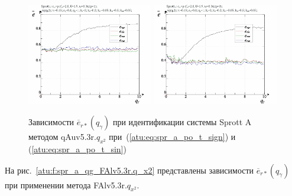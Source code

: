 \begin{figure}[h!]
  \centerline{
    \includegraphics[width=0.49\textwidth]{p/cha/spr_a/qAuv5.3r/sprott_a_qAuv5_3r_qx2-p_qgamma_e_sign.png}
    \hfill
    \includegraphics[width=0.49\textwidth]{p/cha/spr_a/qAuv5.3r/sprott_a_qAuv5_3r_qx2-p_qgamma_e_sin.png}
  }
  \caption{Зависимости $\overline{e}_{r*}(q_\gamma)$ при идентификации системы Sprott A методом qAuv5.3r.$q_{x^2}$
   при~(\ref{atu:eq:spr_a_po_t_sign}) и (\ref{atu:eq:spr_a_po_t_sin})}
  \label{atu:f:spr_a_qg_qAuv5.3r.q_x2}
\end{figure}

На рис.~\ref{atu:f:spr_a_qg_FAlv5.3r.q_x2} представлены зависимости
$\overline{e}_{r*}(q_\gamma)$ при применении метода FAlv5.3r.$q_{x^2}$.

